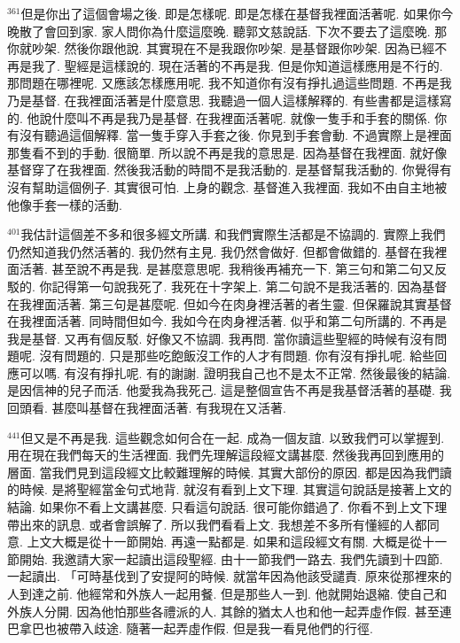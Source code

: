 \documentclass{book}
\begin{document}
$^{361}$但是你出了這個會場之後.
即是怎樣呢.
即是怎樣在基督我裡面活著呢.
如果你今晚散了會回到家.
家人問你為什麼這麼晚.
聽郭文慈說話.
下次不要去了這麼晚.
那你就吵架.
然後你跟他說.
其實現在不是我跟你吵架.
是基督跟你吵架.
因為已經不再是我了.
聖經是這樣說的.
現在活著的不再是我.
但是你知道這樣應用是不行的.
那問題在哪裡呢.
又應該怎樣應用呢.
我不知道你有沒有掙扎過這些問題.
不再是我乃是基督.
在我裡面活著是什麼意思.
我聽過一個人這樣解釋的.
有些書都是這樣寫的.
他說什麼叫不再是我乃是基督.
在我裡面活著呢.
就像一隻手和手套的關係.
你有沒有聽過這個解釋.
當一隻手穿入手套之後.
你見到手套會動.
不過實際上是裡面那隻看不到的手動.
很簡單.
所以說不再是我的意思是.
因為基督在我裡面.
就好像基督穿了在我裡面.
然後我活動的時間不是我活動的.
是基督幫我活動的.
你覺得有沒有幫助這個例子.
其實很可怕.
上身的觀念.
基督進入我裡面.
我如不由自主地被他像手套一樣的活動.

$^{401}$我估計這個差不多和很多經文所講.
和我們實際生活都是不協調的.
實際上我們仍然知道我仍然活著的.
我仍然有主見.
我仍然會做好.
但都會做錯的.
基督在我裡面活著.
甚至說不再是我.
是甚麼意思呢.
我稍後再補充一下.
第三句和第二句又反駁的.
你記得第一句說我死了.
我死在十字架上.
第二句說不是我活著的.
因為基督在我裡面活著.
第三句是甚麼呢.
但如今在肉身裡活著的者生靈.
但保羅說其實基督在我裡面活著.
同時間但如今.
我如今在肉身裡活著.
似乎和第二句所講的.
不再是我是基督.
又再有個反駁.
好像又不協調.
我再問.
當你讀這些聖經的時候有沒有問題呢.
沒有問題的.
只是那些吃飽飯沒工作的人才有問題.
你有沒有掙扎呢.
給些回應可以嗎.
有沒有掙扎呢.
有的謝謝.
證明我自己也不是太不正常.
然後最後的結論.
是因信神的兒子而活.
他愛我為我死己.
這是整個宣告不再是我基督活著的基礎.
我回頭看.
甚麼叫基督在我裡面活著.
有我現在又活著.

$^{441}$但又是不再是我.
這些觀念如何合在一起.
成為一個友誼.
以致我們可以掌握到.
用在現在我們每天的生活裡面.
我們先理解這段經文講甚麼.
然後我再回到應用的層面.
當我們見到這段經文比較難理解的時候.
其實大部份的原因.
都是因為我們讀的時候.
是將聖經當金句式地背.
就沒有看到上文下理.
其實這句說話是接著上文的結論.
如果你不看上文講甚麼.
只看這句說話.
很可能你錯過了.
你看不到上文下理帶出來的訊息.
或者會誤解了.
所以我們看看上文.
我想差不多所有懂經的人都同意.
上文大概是從十一節開始.
再遠一點都是.
如果和這段經文有關.
大概是從十一節開始.
我邀請大家一起讀出這段聖經.
由十一節我們一路去.
我們先讀到十四節.
一起讀出.
「可時基伐到了安提阿的時候.
就當年因為他該受譴責.
原來從那裡來的人到達之前.
他經常和外族人一起用餐.
但是那些人一到.
他就開始退縮.
使自己和外族人分開.
因為他怕那些各禮派的人.
其餘的猶太人也和他一起弄虛作假.
甚至連巴拿巴也被帶入歧途.
隨著一起弄虛作假.
但是我一看見他們的行徑.
\end{document}
